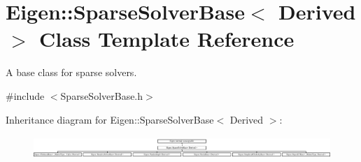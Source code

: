 \hypertarget{class_eigen_1_1_sparse_solver_base}{}\section{Eigen\+::Sparse\+Solver\+Base$<$ Derived $>$ Class Template Reference}
\label{class_eigen_1_1_sparse_solver_base}


A base class for sparse solvers.  




{\ttfamily \#include $<$Sparse\+Solver\+Base.\+h$>$}

Inheritance diagram for Eigen\+::Sparse\+Solver\+Base$<$ Derived $>$\+:\begin{figure}[H]
\begin{center}
\leavevmode
\includegraphics[height=0.853659cm]{class_eigen_1_1_sparse_solver_base}
\end{center}
\end{figure}
